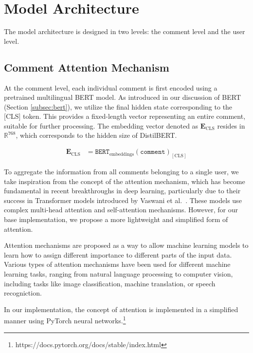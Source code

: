 \documentclass[twoside]{ctuthesis}
\theoremstyle{plain}
\theoremstyle{definition}
\theoremstyle{note}
\begin{document}
\section{Model Architecture}
The model architecture is designed in two levels: the comment level and the user level. 

\subsection{Comment Attention Mechanism}

At the comment level, each individual comment is first encoded using a pretrained multilingual BERT model. As introduced in our discussion of BERT (Section \ref{subsec:bert}), we utilize the final hidden state corresponding to the [CLS] token. This provides a fixed-length vector representing an entire comment, suitable for further processing. The embedding vector denoted as \( \mathbf{E}_{\mathrm{CLS}} \) resides in \( \mathbb{R}^{768} \), which corresponds to the hidden size of DistilBERT.

\begin{align}
 \mathbf{E}_{\mathrm{CLS}} &= \texttt{BERT}_{\mathrm{embeddings}}(\texttt{comment})_{[\mathrm{CLS}]}
\end{align}

To aggregate the information from all comments belonging to a single user, we take inspiration from the concept of the attention mechanism, which has become fundamental in recent breakthroughs in deep learning, particularly due to their success in Transformer models introduced by Vaswani et al.~\cite{Vaswani2017}. These models use complex multi-head attention and self-attention mechanisms. However, for our base implementation, we propose a more lightweight and simplified form of attention.\par

Attention mechanisms are proposed as a way to allow machine learning models to learn how to assign different importance to different parts of the input data. Various types of attention mechanisms have been used for different machine learning tasks, ranging from natural language processing to computer vision, including tasks like image classification, machine translation, or speech recogniction.\cite{Niu2021}

In our implementation, the concept of attention is implemented in a simplified manner using PyTorch neural networks.\footnote{https://docs.pytorch.org/docs/stable/index.html}\par
\end{document}
